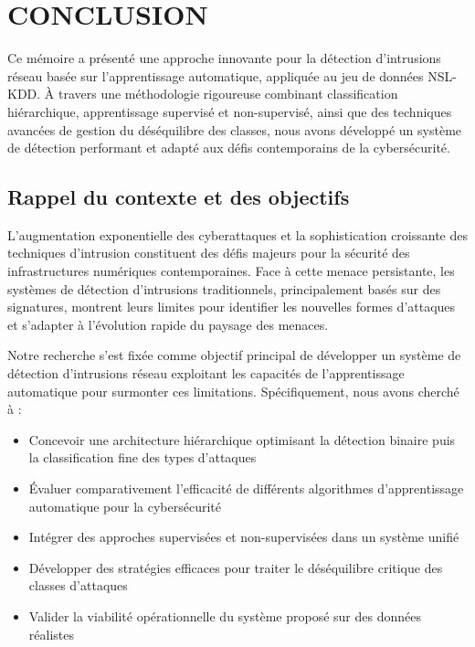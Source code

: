 \newpage
\chapter{CONCLUSION}

Ce mémoire a présenté une approche innovante pour la détection d'intrusions réseau basée sur l'apprentissage automatique, appliquée au jeu de données NSL-KDD. À travers une méthodologie rigoureuse combinant classification hiérarchique, apprentissage supervisé et non-supervisé, ainsi que des techniques avancées de gestion du déséquilibre des classes, nous avons développé un système de détection performant et adapté aux défis contemporains de la cybersécurité.

\section{Rappel du contexte et des objectifs}

L'augmentation exponentielle des cyberattaques et la sophistication croissante des techniques d'intrusion constituent des défis majeurs pour la sécurité des infrastructures numériques contemporaines. Face à cette menace persistante, les systèmes de détection d'intrusions traditionnels, principalement basés sur des signatures, montrent leurs limites pour identifier les nouvelles formes d'attaques et s'adapter à l'évolution rapide du paysage des menaces.

Notre recherche s'est fixée comme objectif principal de développer un système de détection d'intrusions réseau exploitant les capacités de l'apprentissage automatique pour surmonter ces limitations. Spécifiquement, nous avons cherché à :

\begin{itemize}
    \item Concevoir une architecture hiérarchique optimisant la détection binaire puis la classification fine des types d'attaques
    \item Évaluer comparativement l'efficacité de différents algorithmes d'apprentissage automatique pour la cybersécurité
    \item Intégrer des approches supervisées et non-supervisées dans un système unifié
    \item Développer des stratégies efficaces pour traiter le déséquilibre critique des classes d'attaques
    \item Valider la viabilité opérationnelle du système proposé sur des données réalistes
\end{itemize}

